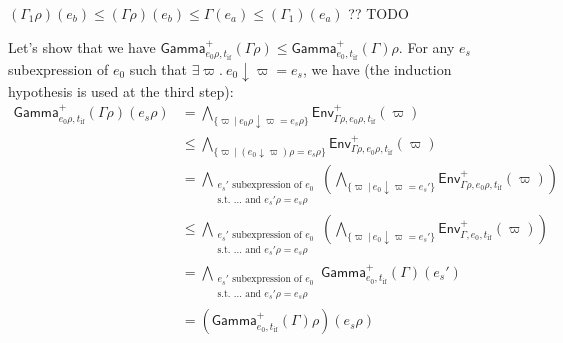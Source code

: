 \documentclass[a4paper]{article}%
\newcommand{\alt}{~|~}
\newcommand{\tyof}[2]{\textsf{typeof}_{#2}(#1)}
\newcommand{\Gp}[2]{\textsf{Env}^{#1}_{#2}}
\newcommand{\occ}[2]{#1{\downarrow}#2}
\newcommand{\Genv}[3]{\textsf{Gamma}^{#1}_{#2}(#3)}
\theoremstyle{definition}
\begin{document}
\begin{description}
\begin{itemize}
            $(\Gamma_1\rho)(e_b) \leq (\Gamma\rho)(e_b) \leq \Gamma(e_a) \leq (\Gamma_1)(e_a)$ ?? TODO
            
    
    
            Let's show that we have $\Genv + {e_0\rho,t_{\text{if}}} {\Gamma\rho} \leq \Genv + {e_0,t_{\text{if}}} \Gamma \rho$.
            For any $e_s$ subexpression of $e_0$ such that $\exists \varpi.\ \occ {e_0} \varpi=e_s$, we have (the induction hypothesis is used at the third step):
            \begin{align*}
              \Genv + {e_0\rho,t_{\text{if}}} {\Gamma\rho}(e_s\rho) &= \bigwedge_{\{\varpi\alt \occ {e_0\rho} \varpi=e_s\rho\}} \Gp + {\Gamma\rho,e_0\rho,t_{\text{if}}} (\varpi)\\
              &\leq \bigwedge_{\{\varpi\alt (\occ {e_0} \varpi)\rho=e_s\rho\}} \Gp + {\Gamma\rho,e_0\rho,t_{\text{if}}} (\varpi)\\
              &= \bigwedge_{\substack{e_s' \text{ subexpression of } e_0\\\text{s.t. } \dots \text{ and } e_s'\rho=e_s\rho}} \left(\bigwedge_{\{\varpi\alt \occ {e_0} \varpi=e_s'\}} \Gp + {\Gamma\rho,e_0\rho,t_{\text{if}}} (\varpi)\right)\\
              &\leq \bigwedge_{\substack{e_s' \text{ subexpression of } e_0\\\text{s.t. } \dots \text{ and } e_s'\rho=e_s\rho}} \left(\bigwedge_{\{\varpi\alt \occ {e_0} \varpi=e_s'\}} \Gp + {\Gamma,e_0,t_{\text{if}}} (\varpi)\right)\\
              &= \bigwedge_{\substack{e_s' \text{ subexpression of } e_0\\\text{s.t. } \dots \text{ and } e_s'\rho=e_s\rho}} \Genv + {e_0,t_{\text{if}}} \Gamma (e_s')\\
              &= (\Genv + {e_0,t_{\text{if}}} \Gamma \rho)(e_s\rho)
            \end{align*}
    
    

\end{itemize}
\end{description}
\end{document}
